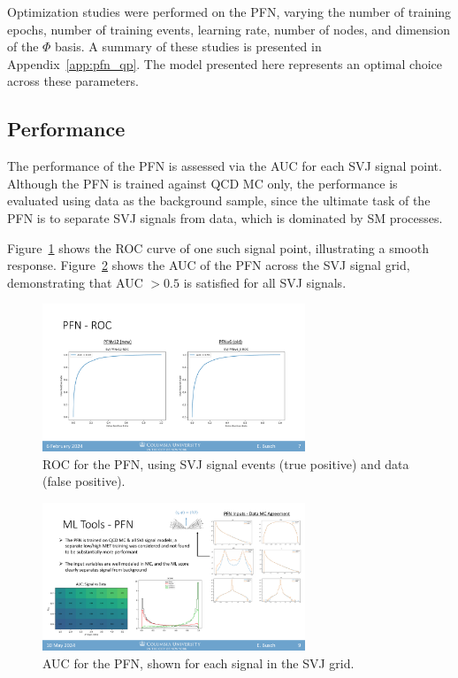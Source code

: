 Optimization studies were performed on the PFN, varying the number of training epochs, number of training events, learning rate, number of nodes, and dimension of the $\Phi$ basis. A summary of these studies is presented in Appendix~\ref{app:pfn_qp}. The model presented here represents an optimal choice across these parameters.

\subsection{Performance}
\label{sec:pfn_performance}

The performance of the PFN is assessed via the AUC for each SVJ signal point.
Although the PFN is trained against QCD MC only, the performance is evaluated using data as the background sample, since the ultimate task of the PFN is to separate SVJ signals from data, which is dominated by SM processes.

Figure~\ref{fig:pfn_roc} shows the ROC curve of one such signal point, illustrating a smooth response.
Figure~\ref{fig:pfn_AUC_score_grid} shows the AUC of the PFN across the SVJ signal grid, demonstrating that AUC $>0.5$ is satisfied for all SVJ signals.

\begin{figure}[!htbp]
\centering
   \includegraphics[width=0.7\textwidth]{figures/ml/pfn_roc}
    \caption{ROC for the PFN, using SVJ signal events (true positive) and data (false positive).
    \label{fig:pfn_roc}}
\end{figure}

\begin{figure}[!htbp]
\centering
   \includegraphics[width=0.7\textwidth]{figures/ml/pfn_AUC_grid}
    \caption{AUC for the PFN, shown for each signal in the SVJ grid.
    \label{fig:pfn_AUC_score_grid}}
\end{figure}

